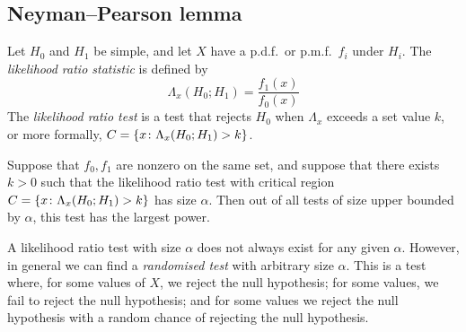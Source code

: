 \subsection{Neyman--Pearson lemma}
Let \( H_0 \) and \( H_1 \) be simple, and let \( X \) have a p.d.f.\ or p.m.f.\ \( f_i \) under \( H_i \).
The \textit{likelihood ratio statistic} is defined by
\[
	\Lambda_x(H_0; H_1) = \frac{f_1(x)}{f_0(x)}
\]
The \textit{likelihood ratio test} is a test that rejects \( H_0 \) when \( \Lambda_x \) exceeds a set value \( k \), or more formally, \( C = \qty{ x \colon \Lambda_x(H_0; H_1) > k } \).
\begin{lemma}
	Suppose that \( f_0, f_1 \) are nonzero on the same set, and suppose that there exists \( k > 0 \) such that the likelihood ratio test with critical region \( C = \qty{x \colon \Lambda_x(H_0; H_1) > k} \) has size \( \alpha \).
	Then out of all tests of size upper bounded by \( \alpha \), this test has the largest power.
\end{lemma}
\begin{remark}
	A likelihood ratio test with size \( \alpha \) does not always exist for any given \( \alpha \).
	However, in general we can find a \textit{randomised test} with arbitrary size \( \alpha \).
	This is a test where, for some values of \( X \), we reject the null hypothesis; for some values, we fail to reject the null hypothesis; and for some values we reject the null hypothesis with a random chance of rejecting the null hypothesis.
\end{remark}
